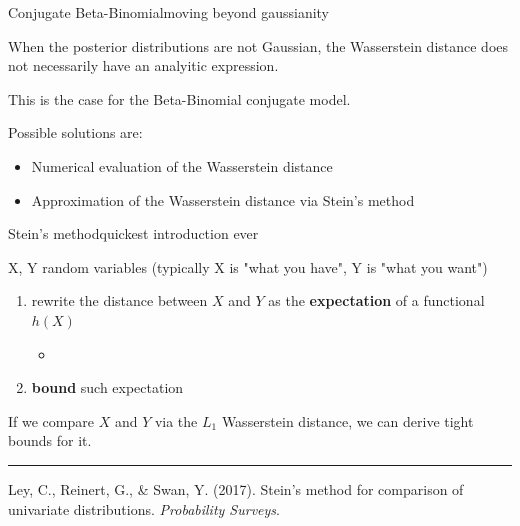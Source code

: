 \documentclass[9 pt]{beamer}
\begin{document}
\begin{frame}{Conjugate Beta-Binomial}{moving beyond gaussianity}

When the posterior distributions are not Gaussian, the Wasserstein distance does not necessarily have an analyitic expression. 

\vspace{0.75cm}

This is the case for the Beta-Binomial conjugate model. 

\vspace{0.75cm}

\pause

Possible solutions are: 
\begin{itemize}
    \item Numerical evaluation of the Wasserstein distance 
    \item Approximation of the Wasserstein distance via Stein's method
\end{itemize}
    
\end{frame}

\begin{frame}{Stein's method}{quickest introduction ever}
    
X, Y random variables (typically X is "what you have", Y is "what you want")
\vspace{0.5cm}

\begin{enumerate}[<+->]
    \item rewrite the distance between $X$ and $Y$ as the \textcolor{light}{\bf expectation} of a functional $h(X)$
    \begin{itemize}
        \item 
    \end{itemize}
    \item \textbf{\color{light} bound} such expectation
\end{enumerate}


\vspace{0.5cm}

\pause 

If we compare $X$ and $Y$ via the $L_1$ Wasserstein distance, we can derive tight bounds for it.

\vspace{0.75cm}


\textcolor[RGB]{220,220,220}{\rule{\linewidth}{0.2pt}}
\tiny{\faBook \; Ley, C., Reinert, G., \& Swan, Y. (2017). Stein’s method for comparison of univariate distributions. \textit{Probability Surveys}.}

\end{frame}
\end{document}
